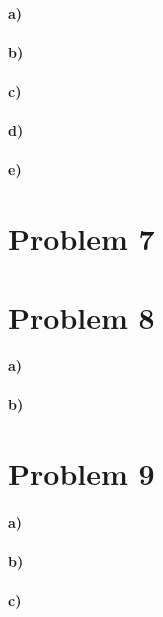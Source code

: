 \documentclass[12pt]{article}
\begin{document}
\paragraph{a)}

\paragraph{b)}

\paragraph{c)}

\paragraph{d)}

\paragraph{e)}

\section*{Problem 7}

\section*{Problem 8}

\paragraph{a)}

\paragraph{b)}

\section*{Problem 9}

\paragraph{a)}

\paragraph{b)}

\paragraph{c)}
\end{document}
